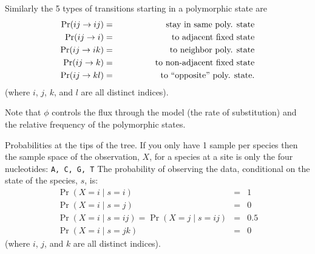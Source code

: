 \documentclass{llncs}
\newcommand{\polyProb}{\ensuremath{\phi}}}
\begin{document}
Similarly the 5 types of transitions starting in a polymorphic state are
\begin{eqnarray}
\Pr(ij\rightarrow ij) & = & \hskip 4em\mbox{stay in same poly. state}\\
\Pr(ij\rightarrow i) & = & \hskip 4em\mbox{to adjacent fixed state}\\
\Pr(ij\rightarrow ik) & = & \hskip 4em\mbox{to neighbor poly. state}\\
\Pr(ij\rightarrow k) & = & \hskip 4em\mbox{to non-adjacent fixed state}\\
\Pr(ij\rightarrow kl) & = & \hskip 4em\mbox{to ``opposite'' poly. state}.
\end{eqnarray}
(where $i$, $j$, $k$, and $l$ are all distinct indices).

Note that $\polyProb$ controls the flux through the model (the rate of substitution) and
the relative frequency of the polymorphic states.

Probabilities at the tips of the tree.
If you only have 1 sample per species then the sample space of the 
    observation, $X$, for a species at a site is only the four nucleotides: \texttt{A, C, G, T}
The probability of observing the data, conditional on the state of the species, $s$, is:
\begin{eqnarray}
\Pr(X=i \mid s=i) & = & 1 \\
\Pr(X=i \mid s=j) & = & 0 \\
\Pr(X=i \mid s=ij)  = \Pr(X=j \mid s=ij) & = & 0.5 \\
\Pr(X=i \mid s=jk) & = & 0
\end{eqnarray}
(where $i$, $j$, and $k$ are all distinct indices).



\end{document}

